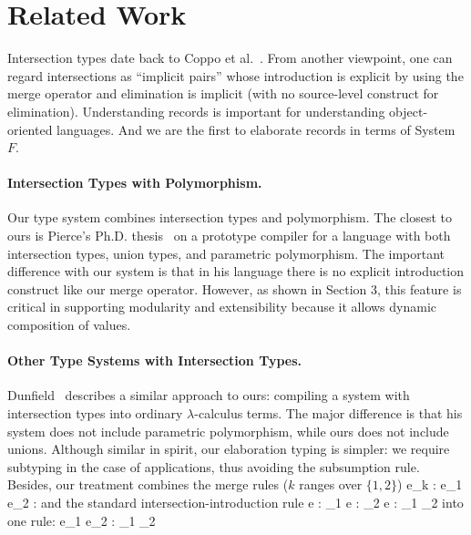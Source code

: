 \section{Related Work}

Intersection types date back to Coppo et al.~\cite{coppo1981functional}. From
another viewpoint, one can regard intersections as ``implicit pairs'' whose
introduction is explicit by using the merge operator and elimination is implicit
(with no source-level construct for elimination). Understanding records is
important for understanding object-oriented languages. And we are the first to
elaborate records in terms of System $ F $.

\cite{barbanera1995intersection}

\paragraph{Intersection Types with Polymorphism.}

Our type system combines intersection types and polymorphism. The closest to
ours is Pierce's Ph.D. thesis~\cite{pierce1991programming} on a prototype compiler for a
language with both intersection types, union types, and parametric polymorphism.
The important difference with our system is that in his language there is no
explicit introduction construct like our merge operator. However, as shown in
Section 3, this feature is critical in supporting modularity and extensibility
because it allows dynamic composition of values.

\paragraph{Other Type Systems with Intersection Types.}

Dunfield~\cite{dunfield2014elaborating} describes a similar approach to ours:
compiling a system with intersection types into ordinary $\lambda$-calculus
terms. The major difference is that his system does not include parametric
polymorphism, while ours does not include unions. Although similar in spirit,
our elaboration typing is simpler: we require subtyping in the case of
applications, thus avoiding the subsumption rule. Besides, our treatment
combines the merge rules ($ k $ ranges over $ \{1, 2\} $)
\infrule
{\Gamma \turns e_k : \ty}
{\Gamma \turns e_1 \dcomma e_2 : \ty}
and the standard intersection-introduction rule
\infrule
{\Gamma \turns e : \ty_1 \andalso \Gamma \turns e : \ty_2}
{\Gamma \turns e : \ty_1 \intersects \ty_2}
into one rule:
{\Gamma \turns e_1 \dcomma e_2 : \ty_1 \intersects \ty_2}

